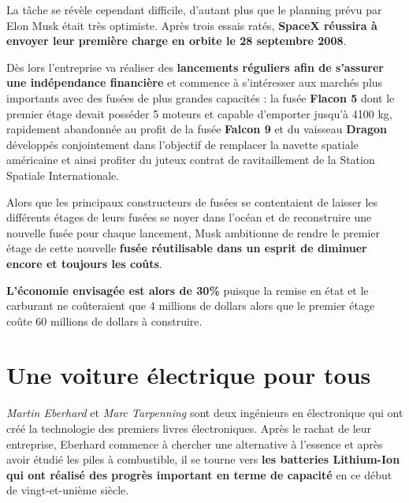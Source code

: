 \vspace{5mm}

La tâche se révèle cependant difficile, d'autant plus que le planning prévu par Elon Musk était très optimiste. Après trois essais ratés, \textbf{SpaceX réussira à envoyer leur première charge en orbite le 28 septembre 2008}.

\vspace{5mm}

Dès lors l'entreprise va réaliser des \textbf{lancements réguliers afin de s'assurer une indépendance financière} et commence à s'intéresser aux marchés plus importants avec des fusées de plus grandes capacités : la fusée \textbf{Flacon 5} dont le premier étage devait posséder 5 moteurs et capable d'emporter jusqu'à 4100 kg, rapidement abandonnée au profit de la fusée \textbf{Falcon 9} et du vaisseau \textbf{Dragon} développés conjointement dans l'objectif de remplacer la navette spatiale américaine et ainsi profiter du juteux contrat de ravitaillement de la Station Spatiale Internationale.

\vspace{5mm}

Alors que les principaux constructeurs de fusées se contentaient de laisser les différents étages de leurs fusées se noyer dans l'océan et de reconstruire une nouvelle fusée pour chaque lancement, Musk ambitionne de rendre le premier étage de cette nouvelle \textbf{fusée réutilisable dans un esprit de diminuer encore et toujours les coûts}\supercite{MuskAmbitionReusableFalcon9}.

\textbf{L'économie envisagée est alors de 30\%} puisque la remise en état et le carburant ne coûteraient que 4 millions de dollars alors que le premier étage coûte 60 millions de dollars à construire\supercite{SpaceXReusable30Percent}.

\section{Une voiture électrique pour tous}

\textit{Martin Eberhard} et \textit{Marc Tarpenning} sont deux ingénieurs en électronique qui ont créé la technologie des premiers livres électroniques. Après le rachat de leur entreprise, Eberhard commence à chercher une alternative à l'essence et après avoir étudié les piles à combustible, il se tourne vers \textbf{les batteries Lithium-Ion qui ont réalisé des progrès important en terme de capacité} en ce début de vingt-et-unième siècle.

